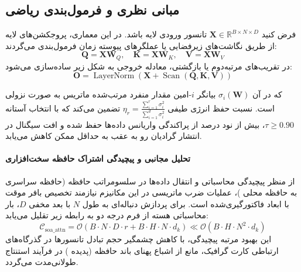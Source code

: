 \subsection{مبانی نظری و فرمول‌بندی ریاضی}
فرض کنید $\mathbf{X} \in \mathbb{R}^{B \times N \times D}$ تانسور ورودی لایه باشد. در این معماری، پروجکشن‌های لایه از طریق نگاشت‌های زیرفضایی یا عملگرهای پیوسته زمان فرمول‌بندی می‌گردند:
 \begin{equation}
\mathbf{Q} = \mathbf{X} \mathbf{W}_Q, \quad \mathbf{K} = \mathbf{X} \mathbf{W}_K, \quad \mathbf{V} = \mathbf{X} \mathbf{W}_V
\end{equation}
در تقریب‌های مرتبه‌دوم یا بازگشتی، معادله خروجی به شکل زیر ساده‌سازی می‌شود:
 \begin{equation}
\mathbf{O} = \operatorname{LayerNorm}\left(\mathbf{X} + \operatorname{Scan}(\mathbf{Q}, \mathbf{K}, \mathbf{V})
\right)
\end{equation}

که در آن $\sigma_i(\mathbf{W})$ بیانگر $i$-امین مقدار منفرد مرتب‌شده ماتریس به صورت نزولی است. نسبت حفظ انرژی طیفی $\eta_r = \frac{\sum_{i=1}^r \sigma_i^2}{\sum_{i=1}^{d} \sigma_i^2}$ تضمین می‌کند که با انتخاب آستانه $\tau \ge 0.90$، بیش از نود درصد از پراکندگی واریانس داده‌ها حفظ شده و افت سیگنال در انتشار گرادیان رو به عقب به حداقل ممکن کاهش می‌یابد.

\paragraph{تحلیل مجانبی و پیچیدگی اشتراک حافظه سخت‌افزاری}
از منظر پیچیدگی محاسباتی و انتقال داده‌ها در سلسومراتب حافظه (حافظه سراسری  به حافظه محلی )، عملیات ضرب ماتریسی در این مکانیزم نیازمند تخصیص بافر موقت با ابعاد فاکتورگیری‌شده است. برای پردازش دنباله‌ای به طول $N$ با بعد مخفی $D$، بار محاسباتی هسته از فرم درجه دو به رابطه زیر تقلیل می‌یابد:
\begin{equation}
\label{eq:complexity_soa_attn}
\mathcal{C}_{\text{soa\_attn}} = \mathcal{O}\left( B \cdot N \cdot D \cdot r + B \cdot H \cdot N \cdot d_k \right) \ll \mathcal{O}\left( B \cdot H \cdot N^2 \cdot d_k \right)
\end{equation}
این بهبود مرتبه پیچیدگی، با کاهش چشمگیر حجم تبادل تانسورها در گذرگاه‌های ارتباطی کارت گرافیک، مانع از اشباع پهنای باند حافظه (پدیده ) در فرآیند استنتاج طولانی‌مدت می‌گردد.
